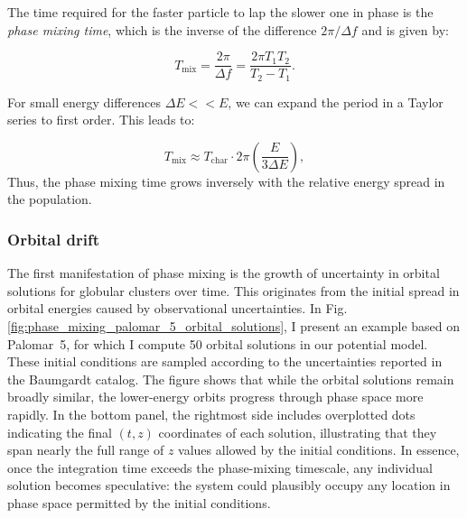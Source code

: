         The time required for the faster particle to lap the slower one in phase is the \textit{phase mixing time}, which is the inverse of the difference $2\pi / \Delta f$ and is given by:

        \begin{equation}
        T_\mathrm{mix} = \frac{2\pi}{\Delta f} = \frac{2\pi T_1 T_2}{T_2 - T_1}.
        \end{equation}

        For small energy differences \( \Delta E << E \), we can expand the period in a Taylor series to first order. This leads to:

        \begin{equation}\label{EQ:phase_mixing}
            T_\mathrm{mix} \approx T_\mathrm{char} \cdot 2\pi \left( \frac{E}{3 \Delta E} \right),
        \end{equation}
        Thus, the phase mixing time grows inversely with the relative energy spread in the population.

        \subsubsection{Orbital drift}
            The first manifestation of phase mixing is the growth of uncertainty in orbital solutions for globular clusters over time. This originates from the initial spread in orbital energies caused by observational uncertainties. In Fig.\ref{fig:phase_mixing_palomar_5_orbital_solutions}, I present an example based on Palomar~5, for which I compute 50 orbital solutions in our potential model. These initial conditions are sampled according to the uncertainties reported in the Baumgardt catalog. The figure shows that while the orbital solutions remain broadly similar, the lower-energy orbits progress through phase space more rapidly. In the bottom panel, the rightmost side includes overplotted dots indicating the final $(t, z)$ coordinates of each solution, illustrating that they span nearly the full range of $z$ values allowed by the initial conditions. In essence, once the integration time exceeds the phase-mixing timescale, any individual solution becomes speculative: the system could plausibly occupy any location in phase space permitted by the initial conditions.


